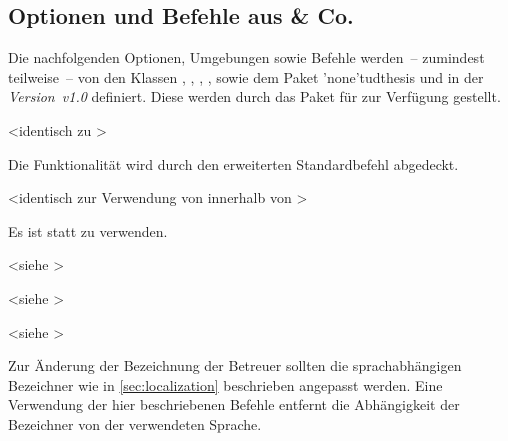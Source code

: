 \begin{DeclareEntity}{}
\subsection{Optionen und Befehle aus  \& Co.}

Die nachfolgenden Optionen, Umgebungen sowie Befehle werden~-- zumindest 
teilweise~-- von den Klassen , , 
, ,  sowie dem Paket 
\Package'none'{tudthesis} und \TUDScript in der \emph{Version~v1.0} definiert. 
Diese werden durch das Paket  für \vTUDScript{\TUDScript} 
zur Verfügung gestellt.

\begin{Declaration}
  {}
  <identisch zu >
\printdeclarationlist

Die Funktionalität wird durch den erweiterten Standardbefehl  
abgedeckt.
\end{Declaration}

\begin{Declaration}
  {}
  <identisch zur Verwendung von  innerhalb von >
\printdeclarationlist

Es ist 
statt  zu verwenden.
\end{Declaration}

\begin{Declaration}
  {}
  <siehe >
\begin{Declaration}
  {}
  <siehe >
\begin{Declaration}
  {}
  <siehe >
\printdeclarationlist

Zur Änderung der Bezeichnung der Betreuer sollten die sprachabhängigen 
Bezeichner wie in \autoref{sec:localization} beschrieben angepasst werden. Eine 
Verwendung der hier beschriebenen Befehle entfernt die Abhängigkeit der 
Bezeichner von der verwendeten Sprache.
\end{Declaration}
\end{Declaration}
\end{Declaration}

\begin{Declaration}
  {}
\printdeclarationlist


\end{Declaration}
\end{DeclareEntity}
